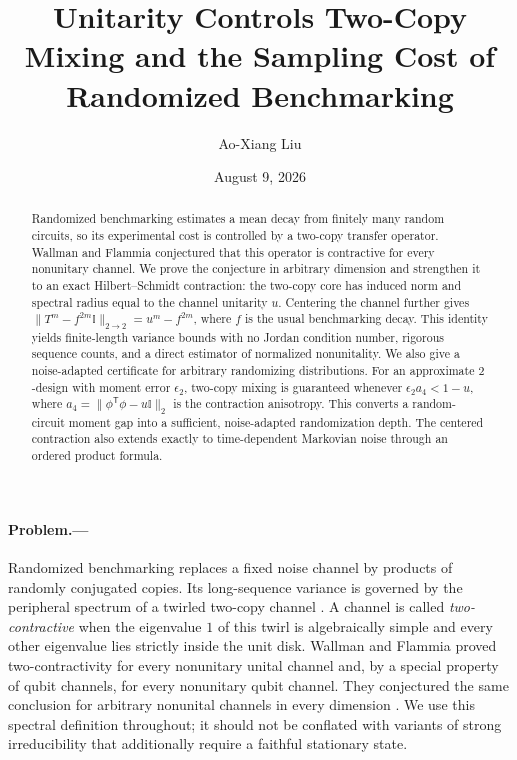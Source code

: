 \documentclass[aps,prl,reprint,superscriptaddress,nofootinbib]{revtex4-2}
\newcommand{\id}{\mathbb{I}}
\begin{document}
\title{Unitarity Controls Two-Copy Mixing and the Sampling Cost of Randomized Benchmarking}

\author{Ao-Xiang Liu}
\noaffiliation
\date{August 9, 2026}

\begin{abstract}
Randomized benchmarking estimates a mean decay from finitely many random
circuits, so its experimental cost is controlled by a two-copy transfer
operator.  Wallman and Flammia conjectured that this operator is contractive
for every nonunitary channel.  We prove the conjecture in arbitrary dimension
and strengthen it to an exact Hilbert--Schmidt contraction: the two-copy core
has induced norm and spectral radius equal to the channel unitarity $u$.
Centering the channel further gives
$\lVert T^m-f^{2m}\id\rVert_{2\to2}=u^m-f^{2m}$, where $f$ is the usual
benchmarking decay.  This identity yields finite-length variance bounds with
no Jordan condition number, rigorous sequence counts, and a direct estimator
of normalized nonunitality.  We also give a noise-adapted certificate for
arbitrary randomizing distributions.  For an approximate $2$-design with
moment error $\epsilon_2$, two-copy mixing is guaranteed whenever
$\epsilon_2a_4<1-u$, where
$a_4=\lVert\phi^{\mathsf T}\phi-u\id\rVert_2$ is the contraction anisotropy.
This converts a random-circuit moment gap into a sufficient, noise-adapted
randomization depth.  The centered contraction also extends exactly to
time-dependent Markovian noise through an ordered product formula.
\end{abstract}

\maketitle

\paragraph{Problem.---}
Randomized benchmarking replaces a fixed noise channel by products of
randomly conjugated copies.  Its long-sequence variance is governed by the
peripheral spectrum of a twirled two-copy channel
\cite{WallmanFlammia2014}.  A channel is called \emph{two-contractive} when
the eigenvalue $1$ of this twirl is algebraically simple and every other
eigenvalue lies strictly inside the unit disk.  Wallman and Flammia
proved two-contractivity for every nonunitary unital channel and, by a special
property of qubit channels, for every nonunitary qubit channel.  They
conjectured the same conclusion for arbitrary nonunital channels in every
dimension \cite{WallmanFlammia2014}.
We use this spectral definition throughout; it should not be conflated with
variants of strong irreducibility that additionally require a faithful
stationary state.
\end{document}
